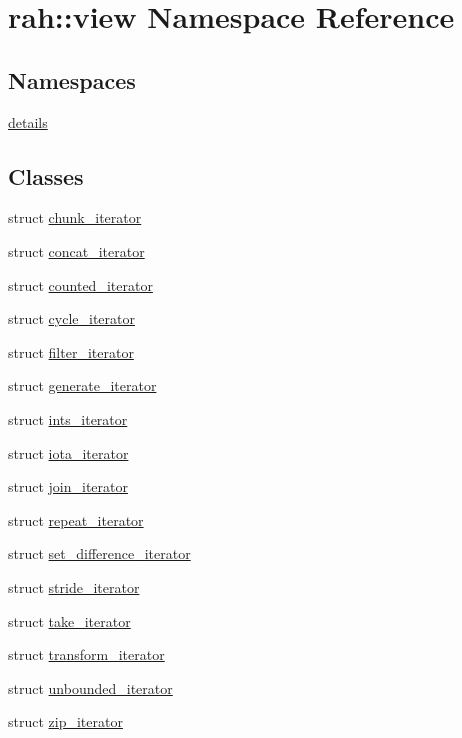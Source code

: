 \hypertarget{namespacerah_1_1view}{}\section{rah\+::view Namespace Reference}
\label{namespacerah_1_1view}
\subsection*{Namespaces}
\begin{DoxyCompactItemize}
\item 
 \mbox{\hyperlink{namespacerah_1_1view_1_1details}{details}}
\end{DoxyCompactItemize}
\subsection*{Classes}
\begin{DoxyCompactItemize}
\item 
struct \mbox{\hyperlink{structrah_1_1view_1_1chunk__iterator}{chunk\+\_\+iterator}}
\item 
struct \mbox{\hyperlink{structrah_1_1view_1_1concat__iterator}{concat\+\_\+iterator}}
\item 
struct \mbox{\hyperlink{structrah_1_1view_1_1counted__iterator}{counted\+\_\+iterator}}
\item 
struct \mbox{\hyperlink{structrah_1_1view_1_1cycle__iterator}{cycle\+\_\+iterator}}
\item 
struct \mbox{\hyperlink{structrah_1_1view_1_1filter__iterator}{filter\+\_\+iterator}}
\item 
struct \mbox{\hyperlink{structrah_1_1view_1_1generate__iterator}{generate\+\_\+iterator}}
\item 
struct \mbox{\hyperlink{structrah_1_1view_1_1ints__iterator}{ints\+\_\+iterator}}
\item 
struct \mbox{\hyperlink{structrah_1_1view_1_1iota__iterator}{iota\+\_\+iterator}}
\item 
struct \mbox{\hyperlink{structrah_1_1view_1_1join__iterator}{join\+\_\+iterator}}
\item 
struct \mbox{\hyperlink{structrah_1_1view_1_1repeat__iterator}{repeat\+\_\+iterator}}
\item 
struct \mbox{\hyperlink{structrah_1_1view_1_1set__difference__iterator}{set\+\_\+difference\+\_\+iterator}}
\item 
struct \mbox{\hyperlink{structrah_1_1view_1_1stride__iterator}{stride\+\_\+iterator}}
\item 
struct \mbox{\hyperlink{structrah_1_1view_1_1take__iterator}{take\+\_\+iterator}}
\item 
struct \mbox{\hyperlink{structrah_1_1view_1_1transform__iterator}{transform\+\_\+iterator}}
\item 
struct \mbox{\hyperlink{structrah_1_1view_1_1unbounded__iterator}{unbounded\+\_\+iterator}}
\item 
struct \mbox{\hyperlink{structrah_1_1view_1_1zip__iterator}{zip\+\_\+iterator}}
\end{DoxyCompactItemize}

